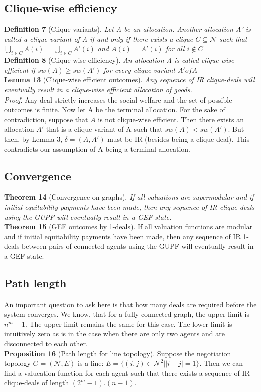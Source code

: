 \documentclass{article}
\begin{document}
\subsection{Clique-wise efficiency}
\textbf{Definition 7} (Clique-variants). \textit{Let A be an allocation. Another allocation A' is called a clique-variant of A if and only if there exists a clique $C\subseteq \mathcal{N}$ such that $\bigcup_{i\in C} A(i) = \bigcup_{i\in C} A'(i)$ and $A(i) = A'(i)$ for all $i\notin C$} \\
\textbf{Definition 8} (Clique-wise efficiency). \textit{An allocation A is called clique-wise efficient if $sw(A)\geq sw(A')$ for every clique-variant $A' of A$}\\
\textbf{Lemma 13} (Clique-wise efficient outcomes). \textit{Any sequence of IR clique-deals will eventually result in a clique-wise efficient allocation of goods.} \\
\textit{Proof}. Any deal strictly increases the social welfare and the set of possible outcomes is finite. Now let A be the terminal allocation. For the sake of contradiction, suppose that $A$ is not clique-wise efficient. Then there exists an allocation $A'$ that is a clique-variant of A such that $sw (A) < sw(A')$.  But then, by Lemma 3, $\delta = (A, A')$ must be IR (besides being a clique-deal). This contradicts our assumption of A being a terminal allocation.
\subsection{Convergence}
\textbf{Theorem 14} (Convergence on graphs). \textit{If all valuations are supermodular and if initial equitability payments have been made, then any sequence of IR clique-deals using the GUPF will eventually result in a GEF state.} \\
\textbf{Theorem 15} (GEF outcomes by 1-deals). If all valuation functions are modular and if initial equitability payments have been made, then any sequence of IR 1-deals between pairs of connected agents using the GUPF will eventually result in a GEF state.
\subsection{Path length}
An important question to ask here is that how many deals are required before the system converges. We know, that for a fully connected graph, the upper limit is $n^m-1$. The upper limit remains the same for this case. The lower limit is intuitively zero as is in the case when there are only two agents and are disconnected to each other. \\
\textbf{Proposition 16} (Path length for line topology). Suppose the negotiation topology $G=(\mathcal{N}, E)$ is a line: $E=\{(i,j) \in \mathcal{N}^2 | |i-j|=1\}$. Then we can find a valueation function for each agent such that there exists a sequence of IR clique-deals of length $(2^m-1).(n-1)$. \\
\end{document}
